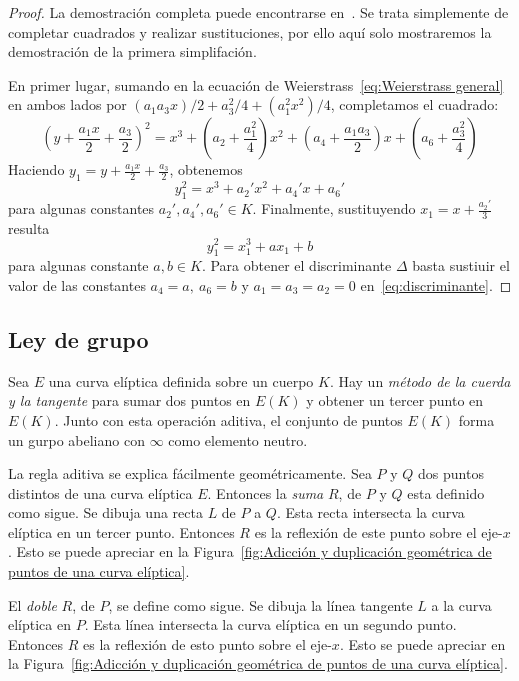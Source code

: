 \begin{proof}
La demostración completa puede encontrarse en~\cite[sec. III.1]{Silverman:2009}. Se trata simplemente de completar cuadrados y realizar sustituciones, por ello aquí solo mostraremos la demostración de la primera simplifación.

En primer lugar, sumando en la ecuación de Weierstrass~\eqref{eq:Weierstrass general} en ambos lados por $(a_1 a_3 x)/2 + a_3^2/4 + (a_1^2 x^2)/4$, completamos el cuadrado:
$$
\left(y + \frac{a_1 x}{2} + \frac{a_3}{2}\right)^2 = x^3 + \left(a_2 + \frac{a_1^2}{4}\right)x^2 + \left(a_4 + \frac{a_1 a_3}{2}\right)x + \left(a_6 + \frac{a_3^2}{4}\right)
$$
Haciendo $y_1 = y + \frac{a_1 x}{2} + \frac{a_3}{2}$, obtenemos
$$
y_1^2 = x^3 + a_2' x^2 + a_4' x + a_6'
$$
para algunas constantes $a_2', a_4', a_6' \in K$. Finalmente, sustituyendo $x_1 = x + \frac{a_2'}{3}$ resulta
$$
y_1^2 = x_1^3 + a x_1 + b
$$
para algunas constante $a, b \in K$. Para obtener el discriminante $\Delta$ basta sustiuir el valor de las constantes $a_4 = a,\ a_6 = b$ y $a_1 = a_3 = a_2 = 0$ en~\eqref{eq:discriminante}.
\end{proof}

\subsection{Ley de grupo}
\label{sub:Ley de grupo}

Sea $E$ una curva elíptica definida sobre un cuerpo $K$. Hay un \emph{método de la cuerda y la tangente} para sumar dos puntos en $E(K)$ y obtener un tercer punto en $E(K)$. Junto con esta operación aditiva, el conjunto de puntos $E(K)$ forma un gurpo abeliano con $\infty$ como elemento neutro.

La regla aditiva se explica fácilmente geométricamente. Sea $P$ y $Q$ dos puntos distintos de una curva elíptica $E$. Entonces la \emph{suma} $R$, de $P$ y $Q$ esta definido como sigue. Se dibuja una recta $L$ de $P$ a $Q$. Esta recta intersecta la curva elíptica en un tercer punto. Entonces $R$ es la reflexión de este punto sobre el eje-$x$. Esto se puede apreciar en la Figura~\ref{fig:Adicción y duplicación geométrica de puntos de una curva elíptica}.

El \emph{doble} $R$, de $P$, se define como sigue. Se dibuja la línea tangente $L$ a la curva elíptica en $P$. Esta línea intersecta la curva elíptica en un segundo punto. Entonces $R$ es la reflexión de esto punto sobre el eje-$x$. Esto se puede apreciar en la Figura~\ref{fig:Adicción y duplicación geométrica de puntos de una curva elíptica}.

